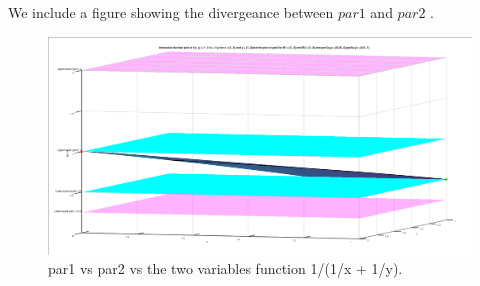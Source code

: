 \documentclass{article}
\begin{document}
\noindent We include a figure showing the divergeance between $par1$ and $par2$ .
\begin{figure}[htbp]
    \centering
    \includegraphics[width=\linewidth]{exe-2.15-diff-par1-par2.png}
    \caption{par1 vs par2 vs the two variables function 1/(1/x + 1/y).}
    \label{fig:yourlabel}
\end{figure}
\end{document}
